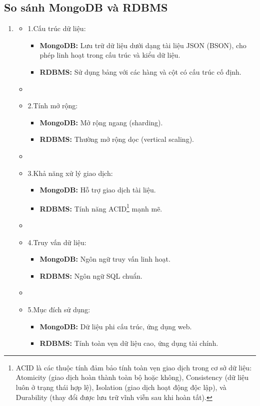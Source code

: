\subsection{So sánh MongoDB và RDBMS}
\begin{enumerate}
    \item []
    \begin{itemize}[left=0.7cm]
        \item[]1.Cấu trúc dữ liệu:
        \begin{itemize}[left=0.5cm]
             \item [$\bullet$]\textbf{MongoDB:} Lưu trữ dữ liệu dưới dạng tài liệu JSON (BSON), cho phép linh hoạt trong cấu trúc và kiểu dữ liệu.
             \item [$\bullet$]\textbf{RDBMS:} Sử dụng bảng với các hàng và cột có cấu trúc cố định.
        \end{itemize}
        \item[] 
        \item[]2.Tính mở rộng:
        \begin{itemize}[left=0.5cm]
             \item [$\bullet$]\textbf{MongoDB:} Mở rộng ngang (sharding).
             \item [$\bullet$]\textbf{RDBMS:} Thường mở rộng dọc (vertical scaling).
        \end{itemize}
        \item[] 
        \item[]3.Khả năng xử lý giao dịch:
        \begin{itemize}[left=0.5cm]
             \item [$\bullet$]\textbf{MongoDB:} Hỗ trợ giao dịch tài liệu.
             \item [$\bullet$]\textbf{RDBMS:} Tính năng ACID\footnote{
ACID là các thuộc tính đảm bảo tính toàn vẹn giao dịch trong cơ sở dữ liệu: Atomicity (giao dịch hoàn thành toàn bộ hoặc không), Consistency (dữ liệu luôn ở trạng thái hợp lệ), Isolation (giao dịch hoạt động độc lập), và Durability (thay đổi được lưu trữ vĩnh viễn sau khi hoàn tất).} mạnh mẽ.
        \end{itemize}
        \item[] 
        \item[]4.Truy vấn dữ liệu:
        \begin{itemize}[left=0.5cm]
             \item [$\bullet$]\textbf{MongoDB:} Ngôn ngữ truy vấn linh hoạt.
             \item [$\bullet$]\textbf{RDBMS:} Ngôn ngữ SQL chuẩn.
        \end{itemize}
        \item[] 
        \item[]5.Mục đích sử dụng:
        \begin{itemize}[left=0.5cm]
             \item [$\bullet$]\textbf{MongoDB:} Dữ liệu phi cấu trúc, ứng dụng web.
             \item [$\bullet$]\textbf{RDBMS:} Tính toàn vẹn dữ liệu cao, ứng dụng tài chính.\cite{noauthor_difference_2019}
        \end{itemize}
    \end{itemize}



\end{enumerate}
